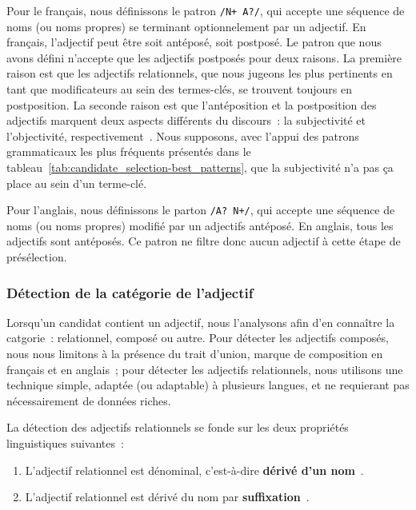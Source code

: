         Pour le français, nous définissons le patron \texttt{/N+ A?/}, qui
        accepte une séquence de noms (ou noms propres) se terminant
        optionnelement par un adjectif. En français, l'adjectif peut être soit
        antéposé, soit postposé. Le patron que nous avons défini n'accepte que
        les adjectifs postposés pour deux raisons. La première raison est que
        les adjectifs relationnels, que nous jugeons les plus pertinents en tant
        que modificateurs au sein des termes-clés, se trouvent toujours en
        postposition. La seconde raison est que l'antéposition et la
        postposition des adjectifs marquent deux aspects différents du
        discours~: la subjectivité et l'objectivité,
        respectivement~\cite{eskenazi2005adjectifavantapres}. Nous supposons,
        avec l'appui des patrons grammaticaux les plus fréquents présentés dans
        le tableau~\ref{tab:candidate_selection-best_patterns}, que la
        subjectivité n'a pas ça place au sein d'un terme-clé.
        
        Pour l'anglais, nous définissons le parton \texttt{/A? N+/}, qui
        accepte une séquence de noms (ou noms propres) modifié par un adjectifs
        antéposé. En anglais, tous les adjectifs sont antéposés. Ce patron ne
        filtre donc aucun adjectif à cette étape de présélection.

      \subsubsection{Détection de la catégorie de l'adjectif}
      \label{subsubsec:main-automatic_keyphrase_annotation-keyphrase_candidate_selection-modifiers_filtering-relational_adjective_detection}
        Lorsqu'un candidat contient un adjectif, nous l'analysons afin d'en
        connaître la catgorie~: relationnel, composé ou autre. Pour détecter les
        adjectifs composés, nous nous limitons à la présence du trait d'union,
        marque de composition en français et en anglais~; pour détecter les
        adjectifs relationnels, nous utilisons une technique simple, adaptée (ou
        adaptable) à plusieurs langues, et ne requierant pas nécessairement de
        données riches.

        La détection des adjectifs relationnels se fonde sur les deux propriétés
        linguistiques suivantes~:
        \begin{enumerate}
          \item{L'adjectif relationnel est dénominal, c'est-à-dire
                \textbf{dérivé d'un
                nom}~\cite{bally1944linguistiquegeneraleetlinguistiquefrancaise}.}
          \item{L'adjectif relationnel est dérivé du nom par
                \textbf{suffixation}~\cite{dubois1999derivation}.}
        \end{enumerate}

